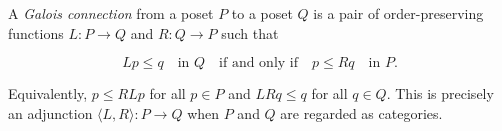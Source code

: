 A \emph{Galois connection} from a poset $P$ to a poset $Q$ is a pair of order-preserving functions $L: P \to Q$ and $R: Q \to P$ such that

\[
Lp \leq q \quad \text{in } Q \quad \text{if and only if} \quad p \leq Rq \quad \text{in } P.
\]

Equivalently, $p \leq RLp$ for all $p \in P$ and $LRq \leq q$ for all $q \in Q$. This is precisely an adjunction $\langle L, R \rangle: P \to Q$ when $P$ and $Q$ are regarded as categories.
